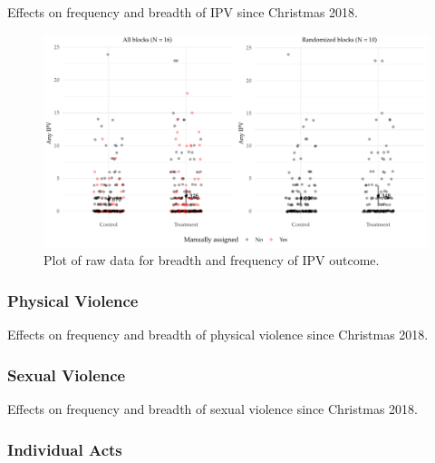 \documentclass[11pt,english]{article}
\begin{document}
\begin{table}[H]
\centering

\caption{Effects on frequency and breadth of IPV since Christmas 2018.}
\label{tab:ipv}
\end{table}

\begin{figure}[H]
\centering
\includegraphics[width = \textwidth]{figures/ipv_freq_plot.pdf}
\caption{Plot of raw data for breadth and frequency of IPV outcome.}
\label{fig:ipv_freq_plot}
\end{figure}

\subsubsection{Physical Violence}

\begin{table}[H]
\centering

\caption{Effects on frequency and breadth of physical violence since Christmas 2018.}
\label{tab:physical}
\end{table}

\subsubsection{Sexual Violence}

\begin{table}[H]
\centering

\caption{Effects on frequency and breadth of sexual violence since Christmas 2018.}
\label{tab:sexual}
\end{table}

\subsubsection{Individual Acts}
\end{document}
